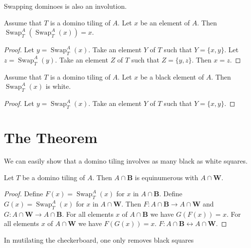 \documentclass{article}
\newcommand{\Black}{\mathbf{B}}
\newcommand{\White}{\mathbf{W}}
\newcommand{\Sw}[3]{\operatorname{Swap}_{#1}^{#2}(#3)}
\begin{document}
Swapping dominoes is also an involution.

\begin{forthel}
    \begin{lemma}
        Assume that $T$ is a domino tiling of $A$. Let $x$ be an element of $A$.
        Then $\Sw{T}{A}{\Sw{T}{A}{x}} = x$.
    \end{lemma}
    \begin{proof}
        Let $y = \Sw{T}{A}{x}$.
        Take an element $Y$ of $T$ such that $Y = \{x,y\}$.
        Let $z = \Sw{T}{A}{y}$.
        Take an element $Z$ of $T$ such that $Z = \{y,z\}$.
        Then $x = z$.
    \end{proof}

    \begin{lemma}
        Assume that $T$ is a domino tiling of $A$.
        Let $x$ be a black element of $A$.
        Then $\Sw{T}{A}{x}$ is white.
    \end{lemma}
    \begin{proof}
        Let $y = \Sw{T}{A}{x}$.
        Take an element $Y$ of $T$ such that $Y = \{x,y\}$.
    \end{proof}
\end{forthel}

\section{The Theorem}

\noindent We can easily show that a domino tiling involves as many black as white squares.

\begin{forthel}
    \begin{lemma}
        Let $T$ be a domino tiling of $A$. Then $A \cap \Black$ is
        equinumerous with $A \cap \White$.
    \end{lemma}
    \begin{proof}
        Define $F(x) = \Sw{T}{A}{x}$ for $x$ in $A \cap \Black$.
        Define $G(x) = \Sw{T}{A}{x}$ for $x$ in $A \cap \White$.
        Then $F: A \cap \Black \to A \cap \White$ and
        $G: A \cap \White \to A \cap \Black$.
        For all elements $x$ of $A \cap \Black$ we have $G(F(x))=x$.
        For all elements $x$ of $A \cap \White$ we have $F(G(x))=x$.
        $F : A \cap \Black \leftrightarrow A \cap \White$.
    \end{proof}
\end{forthel}

\noindent In mutilating the checkerboard, one only removes black squares
\end{document}
